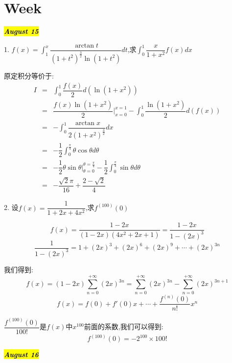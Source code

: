\section{Week }
\hl{\textbf{\textit{August 15}}}

1. $f(x)=\int_{1}^{x}\dfrac{\arctan t}{(1+t^2)^{\frac{3}{2}}\ln(1+t^2)}dt$,求$\int_{0}^{1}\dfrac{x}{1+x^2}f(x)dx$
\begin{solution}

	原定积分等价于:  
	\begin{eqnarray*}
		I&=&\int_{0}^{1}\dfrac{f(x)}{2}d(\ln(1+x^2))\\
		&=&\dfrac{f(x)\ln(1+x^2)}{2}|_{x=0}^{x=1}-\int_{0}^{1}\dfrac{\ln(1+x^2)}{2}d(f(x))\\
		&=&-\int_{0}^{1}\dfrac{\arctan x}{2(1+x^2)^{\frac{3}{2}}}dx\\
		&=&-\dfrac{1}{2}\int_{0}^{\frac{\pi}{4}}\theta\cos\theta d\theta\\
		&=&-\dfrac{1}{2}\theta\sin\theta|_{\theta=0}^{\theta=\frac{\pi}{4}}-\dfrac{1}{2}\int_{0}^{\frac{\pi}{4}}\sin \theta d\theta\\
		&=&-\dfrac{\sqrt{2}\pi}{16}+\dfrac{2-\sqrt{2}}{4}
	\end{eqnarray*}
\end{solution}

2. 设$f(x)=\dfrac{1}{1+2x+4x^2}$,求$f^{(100)}(0)$
\begin{solution}

	$$f(x)=\dfrac{1-2x}{(1-2x)(4x^2+2x+1)}=\dfrac{1-2x}{1-(2x)^3}$$
	$$\dfrac{1}{1-(2x)^3}=1+(2x)^3+(2x)^6+(2x)^9+\cdots+(2x)^{3n}$$
	
	我们得到:$$f(x)=(1-2x)\sum\limits_{n=0}^{+\infty}(2x)^{3n}=\sum\limits_{n=0}^{+\infty}(2x)^{3n}-\sum\limits_{n=0}^{+\infty}(2x)^{3n+1}$$
	$$f(x)=f(0)+f'(0)x+\cdots+\dfrac{f^{(n)}(0)}{n!}x^n$$
	
	$\dfrac{f^{(100)}(0)}{100!}$是$f(x)$中$x^{100}$前面的系数,我们可以得到:  
	$$f^{(100)}(0)=-2^{100}\times100!$$
\end{solution}

\hl{\textbf{\textit{August 16}}}

